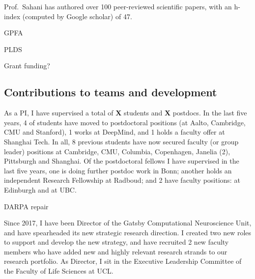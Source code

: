 Prof.\ Sahani has authored over 100 peer-reviewed scientific papers,
with an h-index (computed by Google scholar) of 47.

GPFA

PLDS

Grant funding?


\subsection{Contributions to teams and development}

As a PI, I have supervised a total of \textbf{X} students and \textbf{X} postdocs.  
In the last five years, 4 of students have moved to postdoctoral positions (at
Aalto, Cambridge, CMU and Stanford), 1 works at DeepMind, and 1 holds a faculty offer at Shanghai Tech.  In all, 8 previous students have now secured faculty (or group leader) positions at Cambridge, CMU, Columbia, Copenhagen, Janelia (2), Pittsburgh and Shanghai.
%
Of the postdoctoral fellows I have supervised in the last five years, one is doing further postdoc work in Bonn; another holds an independent
Research Fellowship at Radboud; and 2 have faculty positions: at Edinburgh and at UBC.

DARPA repair

Since 2017, I have been Director of the Gatsby Computational Neuroscience Unit, and have spearheaded its new strategic research direction. I created two new roles to support and develop the new strategy, and have recruited 2 new faculty members who have added new and highly relevant research strands to our research portfolio. As Director, I sit in the Executive Leadership Committee of the Faculty of Life Sciences at UCL. 
 


% 

